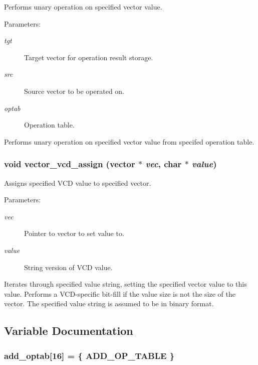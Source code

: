 Performs unary operation on specified vector value.

\begin{Desc}
\item[Parameters: ]\par
\begin{description}
\item[{\em 
tgt}]Target vector for operation result storage. \item[{\em 
src}]Source vector to be operated on. \item[{\em 
optab}]Operation table.\end{description}
\end{Desc}
Performs unary operation on specified vector value from specifed operation table. 
\subsubsection{\setlength{\rightskip}{0pt plus 5cm}void vector\_\-vcd\_\-assign ({\bf vector} $\ast$ {\em vec}, char $\ast$ {\em value})}\label{vector_8c_a34}


Assigns specified VCD value to specified vector.

\begin{Desc}
\item[Parameters: ]\par
\begin{description}
\item[{\em 
vec}]Pointer to vector to set value to. \item[{\em 
value}]String version of VCD value.\end{description}
\end{Desc}
Iterates through specified value string, setting the specified vector value to this value. Performs a VCD-specific bit-fill if the value size is not the size of the vector. The specified value string is assumed to be in binary format. 

\subsection{Variable Documentation}
\subsubsection{ add\_\-optab[16] = \{ ADD\_\-OP\_\-TABLE \}}\label{vector_8c_a6}


